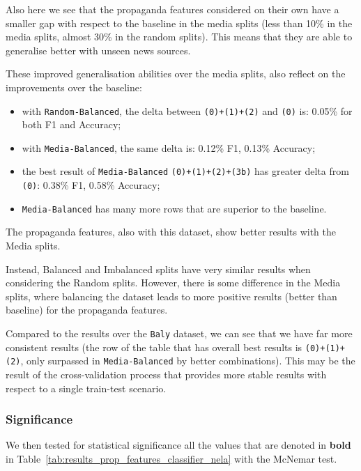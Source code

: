 Also here we see that the propaganda features considered on their own have a smaller gap with respect to the baseline in the media splits (less than 10\% in the media splits, almost 30\% in the random splits).
This means that they are able to generalise better with unseen news sources.

These improved generalisation abilities over the media splits, also reflect on the improvements over the baseline:
\begin{itemize}
    \item with \texttt{Random-Balanced}, the delta between \texttt{(0)+(1)+(2)} and \texttt{(0)} is: 0.05\% for both F1 and Accuracy; %
    \item with \texttt{Media-Balanced}, the same delta is: 0.12\% F1, 0.13\% Accuracy; %
    \item the best result of \texttt{Media-Balanced} \texttt{(0)+(1)+(2)+(3b)} has greater delta from \texttt{(0)}: 0.38\% F1, 0.58\% Accuracy; %
    \item \texttt{Media-Balanced} has many more rows that are superior to the baseline.
\end{itemize}

The propaganda features, also with this dataset, show better results with the Media splits.

Instead, Balanced and Imbalanced splits have very similar results when considering the Random splits. However, there is some difference in the Media splits, where balancing the dataset leads to more positive results (better than baseline) for the propaganda features.

Compared to the results over the \texttt{Baly} dataset, we can see that we have far more consistent results (the row of the table that has overall best results is \texttt{(0)+(1)+(2)}, only surpassed in \texttt{Media-Balanced} by better combinations).
This may be the result of the cross-validation process that provides more stable results with respect to a single train-test scenario.

\subsubsection{Significance}
We then tested for statistical significance all the values that are denoted in \textbf{bold} in Table~\ref{tab:results_prop_features_classifier_nela} with the McNemar test.

